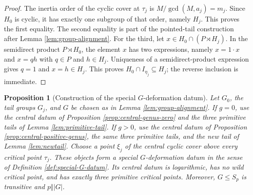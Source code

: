 \documentclass[11pt]{amsart}
\theoremstyle{plain}
\newtheorem{proposition}[theorem]{Proposition}
\theoremstyle{definition}
\numberwithin{equation}{section}
\begin{document}
\begin{proof}
The inertia order of the cyclic cover at $\tau_j$ is
$M/\gcd(M,a_j)=m_j$.  Since $H_0$ is cyclic, it has exactly one subgroup of
that order, namely $H_j$.  This proves the first equality.  The second
equality is part of the pointed-tail construction after Lemma
\ref{lem:group-alignment}.  For the third, let
$x\in H_0\cap(P\rtimes H_j)$.  In the semidirect product
$P\rtimes H_0$, the element $x$ has two expressions, namely $x=1\cdot x$
and $x=q h$ with $q\in P$ and $h\in H_j$.  Uniqueness of a
semidirect-product expression gives $q=1$ and $x=h\in H_j$.  This proves
$H_0\cap I_{\eta_j}\subseteq H_j$; the reverse inclusion is immediate.

\end{proof}

\begin{proposition}[Construction of the special $G$-deformation datum]
\label{prop:assembled-special-datum}
Let $G_0$, the tail groups $G_j$, and $G$ be chosen as in Lemma
\ref{lem:group-alignment}.  If $g=0$, use the central datum of Proposition
\ref{prop:central-genus-zero} and the three primitive tails of Lemma
\ref{lem:primitive-tail}.  If $g>0$, use the central datum of Proposition
\ref{prop:central-positive-genus}, the same three primitive tails, and the
new tail of Lemma \ref{lem:newtail}.  Choose a point $\xi_j$ of the central
cyclic cover above every critical point $\tau_j$.  These objects form a
special $G$-deformation datum in the sense of Definition
\ref{def:special-G-datum}.  Its central datum is logarithmic, has no wild
critical point, and has exactly three primitive critical points.  Moreover,
$G\leq S_p$ is transitive and $p\Vert |G|$.
\end{proposition}
\end{document}
